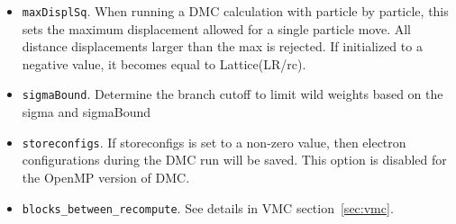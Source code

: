 \begin{itemize}
\item \texttt{maxDisplSq}.  When running a DMC calculation with particle by particle, this sets the maximum displacement allowed for a single particle move.  All distance displacements larger than the max is rejected.  If initialized to a negative value, it becomes equal to Lattice(LR/rc).

\item \texttt{sigmaBound}.  Determine the branch cutoff to limit wild weights based on the sigma and sigmaBound


\item \texttt{storeconfigs}. If storeconfigs is set to a non-zero value, then electron configurations during the DMC run will be saved. This option is disabled for the OpenMP version of DMC.

\item \texttt{blocks\_between\_recompute}. See details in VMC section~\ref{sec:vmc}.










\end{itemize}
